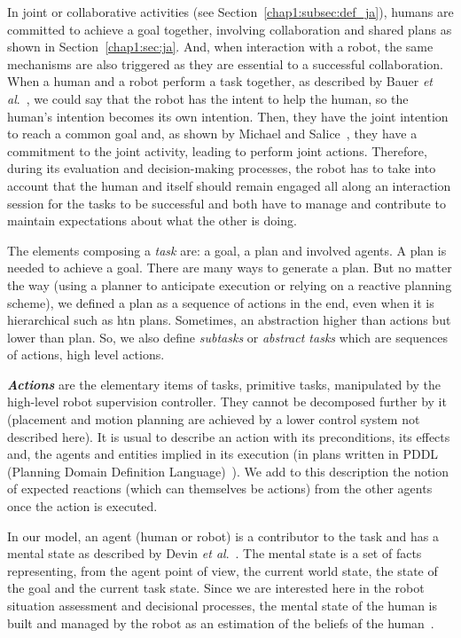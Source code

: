 \documentclass[a4paper,11pt,twoside]{StyleThese}
\begin{document}
In joint or collaborative activities (see Section~\ref{chap1:subsec:def_ja}), humans are committed to achieve a goal together, involving collaboration and shared plans as shown in Section~\ref{chap1:sec:ja}. And, when interaction with a robot, the same mechanisms are also triggered as they are essential to a successful collaboration. When a human and a robot perform a task together, as described by Bauer \textit{et al}.~\cite{bauer_2008_collab}, we could say that the robot has the intent to help the human, so the human's intention becomes its own intention. Then, they have the joint intention to reach a common goal and, as shown by Michael and Salice~\cite{michael_2017_commitment}, they have a commitment to the joint activity, leading to perform joint actions. Therefore, during its evaluation and decision-making processes, the robot has to take into account that the human and itself should remain engaged all along an interaction session for the tasks to be successful and both have to manage and contribute to maintain expectations about what the other is doing. 

The elements composing a \textit{task} are: a goal, a plan and involved agents. A plan is needed to achieve a goal. There are many ways to generate a plan. But no matter the way (using a planner to anticipate execution or relying on a reactive planning scheme), we defined a plan as a sequence of actions in the end, even when it is hierarchical such as \acrshort{htn} plans. Sometimes, an abstraction higher than actions but lower than plan. So, we also define \emph{subtasks} or \emph{abstract tasks} which are sequences of actions, high level actions. 

\textbf{\textit{Actions}} are the elementary items of tasks, primitive tasks, manipulated by the high-level robot supervision controller. They cannot be decomposed further by it (\eg placement and motion planning are achieved by a lower control system not described here). It is usual to describe an action with its preconditions, its effects and, the agents and entities implied in its execution (\eg in plans written in PDDL (Planning Domain Definition Language)~\cite{ghallab_98_pddl}). We add to this description the notion of expected reactions (which can themselves be actions) from the other agents once the action is executed.

In our model, an agent (human or robot) is a contributor to the task and has a mental state as described by Devin \textit{et al}.~\cite{devin_2016_implemented}. The mental state is a set of facts representing, from the agent point of view, the current world state, the state of the goal and the current task state. Since we are interested here in the robot situation assessment and decisional processes, the mental state of the human is built and managed by the robot as an estimation of the beliefs of the human~\cite{milliez_2014_framework, hiatt_2017_modeling,tabrez_2020}.
\end{document}

